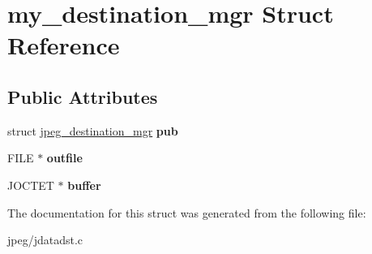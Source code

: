 \hypertarget{structmy__destination__mgr}{}\section{my\+\_\+destination\+\_\+mgr Struct Reference}
\label{structmy__destination__mgr}
\subsection*{Public Attributes}
\begin{DoxyCompactItemize}
\item 
struct \hyperlink{structjpeg__destination__mgr}{jpeg\+\_\+destination\+\_\+mgr} {\bfseries pub}\hypertarget{structmy__destination__mgr_a79800f27d02bb0446203ecf552034980}{}\label{structmy__destination__mgr_a79800f27d02bb0446203ecf552034980}

\item 
F\+I\+LE $\ast$ {\bfseries outfile}\hypertarget{structmy__destination__mgr_a759400870db2885a9c7cf49d8d3ce38e}{}\label{structmy__destination__mgr_a759400870db2885a9c7cf49d8d3ce38e}

\item 
J\+O\+C\+T\+ET $\ast$ {\bfseries buffer}\hypertarget{structmy__destination__mgr_aa93f525223299889fb3e491a7df3d412}{}\label{structmy__destination__mgr_aa93f525223299889fb3e491a7df3d412}

\end{DoxyCompactItemize}


The documentation for this struct was generated from the following file\+:\begin{DoxyCompactItemize}
\item 
jpeg/jdatadst.\+c\end{DoxyCompactItemize}
